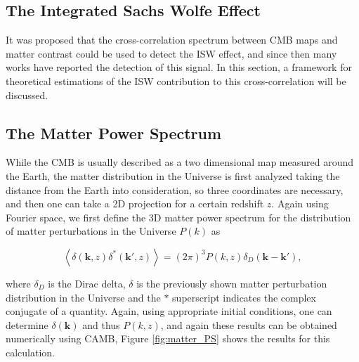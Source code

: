 \documentclass[openany,a4paper,12pt,oneside]{book}
\newcommand{\av}[1]{\left\langle #1 \right\rangle} %
\begin{document}
\begin{spacing}{1.5}
\section{The Integrated Sachs Wolfe Effect}\label{ch2:ISW_effect_section}

It was proposed that the cross-correlation spectrum between CMB maps and matter contrast could be used to detect the ISW effect\cite{Turok96}, and since then many works have reported the detection of this signal\cite{cross_corr:Afshordi, cross_corr:Crittenden2005a, cross_corr:Crittenden2005b, cross_corr:Planck}. In this section, a framework for theoretical estimations of the ISW contribution to this cross-correlation will be discussed.

\subsection{The Matter Power Spectrum}

While the CMB is usually described as a two dimensional map measured around the Earth, the matter distribution in the Universe is first analyzed taking the distance from the Earth into consideration, so three coordinates are necessary, and then one can take a 2D projection for a certain redshift $z$. Again using Fourier space, we first define the 3D matter power spectrum for the distribution of matter perturbations in the Universe $P(k)$ as

\begin{equation}\label{def:P(k)}
    \av{\delta(\mathbf{k}, z) \delta^*(\mathbf{k}', z)}=(2\pi)^3 P(k,z) \delta_D(\mathbf{k}-\mathbf{k}'),
\end{equation}

\noindent where $\delta_D$ is the Dirac delta, $\delta$ is the previously shown matter perturbation distribution in the Universe and the $*$ superscript indicates the complex conjugate of a quantity. Again, using appropriate initial conditions, one can determine $\delta(\mathbf{k})$ and thus $P(k,z)$, and again these results can be obtained numerically using CAMB, Figure \ref{fig:matter_PS} shows the results for this calculation.  


\end{spacing}
\end{document}
